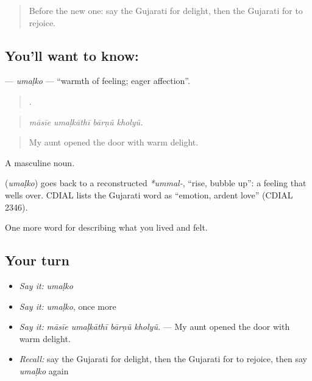\label{lesson:GU-C447-umalko}



\begin{quote}
Before the new one: say the Gujarati for delight, then the Gujarati for to rejoice.
\end{quote}

\subsection*{You'll want to know: }
\textbf{} — \emph{umaḷko} — \textquotedblleft{}warmth of feeling; eager affection\textquotedblright{}.

\begin{quote}
   .
\end{quote}

\begin{quote}
\emph{māsīe umaḷkāthī bārṇũ kholyũ.}
\end{quote}

\begin{quote}
My aunt opened the door with warm delight.
\end{quote}

A masculine noun.

\begin{cousinweb}
\textbf{} (\emph{umaḷko}) goes back to a reconstructed \emph{*ummal-}, \textquotedblleft{}rise, bubble up\textquotedblright{}: a feeling that wells over. CDIAL lists the Gujarati word as \textquotedblleft{}emotion, ardent love\textquotedblright{} (CDIAL 2346).
\end{cousinweb}

\begin{grammarlens}[title={What you've built}]
One more word for describing what you lived and felt.
\end{grammarlens}

\subsection*{Your turn}
\begin{itemize}
\raggedright
  \item \emph{Say it:} \emph{umaḷko}
  \item \emph{Say it:} \emph{umaḷko}, once more
  \item \emph{Say it:} \emph{māsīe umaḷkāthī bārṇũ kholyũ.} — My aunt opened the door with warm delight.
  \item \emph{Recall:} say the Gujarati for delight, then the Gujarati for to rejoice, then say \emph{umaḷko} again
\end{itemize}

